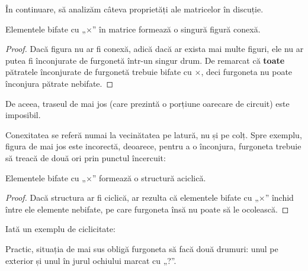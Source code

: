 În continuare, să analizăm câteva proprietăți ale matricelor în discuție.

\begin{property}
  Elementele bifate cu „$\times$” în matrice formează o singură figură conexă.
\end{property}

\begin{proof}
  Dacă figura nu ar fi conexă, adică dacă ar exista mai multe figuri, ele nu
  ar putea fi înconjurate de furgonetă într-un singur drum. De remarcat că
  {\bf toate} pătratele înconjurate de furgonetă trebuie bifate cu $\times$,
  deci furgoneta nu poate înconjura pătrate nebifate.
\end{proof}

De aceea, traseul de mai jos (care prezintă o porțiune oarecare de circuit)
este imposibil.


Conexitatea se referă numai la vecinătatea pe latură, nu și pe colț. Spre
exemplu, figura de mai jos este incorectă, deoarece, pentru a o înconjura,
furgoneta trebuie să treacă de două ori prin punctul încercuit:


\begin{property}
  Elementele bifate cu „$\times$” formează o structură aciclică.
\end{property}

\begin{proof}
  Dacă structura ar fi ciclică, ar rezulta că elementele bifate cu „$\times$”
  închid între ele elemente nebifate, pe care furgoneta însă nu poate să le
  ocolească.
\end{proof}

Iată un exemplu de ciclicitate:


Practic, situația de mai sus obligă furgoneta să facă două drumuri: unul pe
exterior și unul în jurul ochiului marcat cu „?”.

